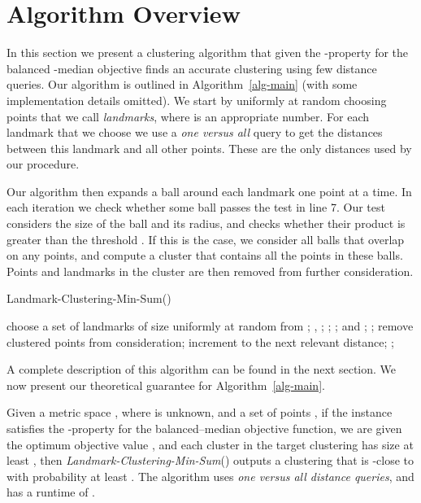 \documentclass{llncs} \usepackage{algorithm}
\begin{document}
\section{Algorithm Overview}

In this section we present a clustering algorithm that given the -property for the balanced -median objective finds an accurate clustering using few distance queries.   Our algorithm is outlined in Algorithm~\ref{alg-main} (with some implementation details omitted).  We start by uniformly at random choosing  points that we call \emph{landmarks}, where  is an appropriate number.  For each landmark that we choose we use a \emph{one versus all} query to get the distances between this landmark and all other points.  These are the only distances used by our procedure.

Our algorithm then expands a ball  around each landmark  one point at a time.  In each iteration we check whether some ball  passes the test in line 7.  Our test considers the size of the ball and its radius, and checks whether their product is greater than the threshold .  If this is the case, we consider all balls that overlap  on any points, and compute a cluster that contains all the points in these balls.  Points and landmarks in the cluster are then removed from further consideration.

\vspace{-0.5cm}
\begin{algorithm}[H]
\caption{Landmark-Clustering-Min-Sum()}
\begin{algorithmic}[1]
\STATE choose a set of landmarks  of size  uniformly at random from ;
\STATE , ;
\WHILE{}
\STATE ;
\ENDFOR
\IF{}
\STATE ;
\STATE  and ;
\STATE ;
\STATE remove clustered points from consideration;
\ENDIF
\STATE increment  to the next relevant distance;
\ENDWHILE
\RETURN ;
\end{algorithmic}
\label{alg-main}
\end{algorithm}
\vspace{-0.5cm}

A complete description of this algorithm can be found in the next section.  We now present our theoretical guarantee for Algorithm~\ref{alg-main}.

\begin{theorem}\label{thm:Main}
Given a metric space , where  is unknown, and a set of points ,
if the instance  satisfies the -property for the balanced--median objective function, we are given the optimum objective value , and each cluster in the target clustering  has size at least
, then \emph{Landmark-Clustering-Min-Sum}() outputs a clustering that is -close to  with probability at least .   The algorithm uses  \emph{one versus all distance queries}, and has a runtime of .
\end{theorem}
\end{document}
